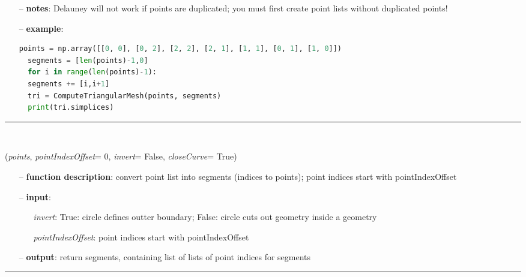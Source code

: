 \begin{itemize}[leftmargin=1.4cm]
\begin{itemize}[leftmargin=1.4cm]
\begin{itemize}[leftmargin=0.5cm]
\begin{itemize}[leftmargin=1.4cm]
\begin{itemize}[leftmargin=1.4cm]
\begin{itemize}[leftmargin=0.5cm]
\begin{itemize}[leftmargin=1.4cm]
\begin{itemize}[leftmargin=0.5cm]
\begin{itemize}[leftmargin=0.7cm]
\item[--]
{\bf notes}: Delauney will not work if points are duplicated; you must first create point lists without duplicated points!
\item[--]
{\bf example}: \vspace{-12pt}\ei\begin{lstlisting}[language=Python, xleftmargin=36pt]
  points = np.array([[0, 0], [0, 2], [2, 2], [2, 1], [1, 1], [0, 1], [1, 0]])
  segments = [len(points)-1,0]
  for i in range(len(points)-1):
  segments += [i,i+1]
  tri = ComputeTriangularMesh(points, segments)
  print(tri.simplices)
\end{lstlisting}\vspace{-24pt}\bi\item[]\vspace{-24pt}\vspace{12pt}\end{itemize}
%
\noindent\rule{8cm}{0.75pt}\vspace{1pt} \\ 
\begin{flushleft}
\label{sec:graphicsDataUtilities:SegmentsFromPoints}
({\it points}, {\it pointIndexOffset}= 0, {\it invert}= False, {\it closeCurve}= True)
\end{flushleft}
\setlength{\itemindent}{0.7cm}
\begin{itemize}[leftmargin=0.7cm]
\item[--]
{\bf function description}: convert point list into segments (indices to points); point indices start with pointIndexOffset
\item[--]
{\bf input}: \vspace{-6pt}
\begin{itemize}[leftmargin=1.2cm]
\setlength{\itemindent}{-0.7cm}
\item[]{\it invert}: True: circle defines outter boundary; False: circle cuts out geometry inside a geometry
\item[]{\it pointIndexOffset}: point indices start with pointIndexOffset
\end{itemize}
\item[--]
{\bf output}: return segments, containing list of lists of point indices for segments
\vspace{12pt}\end{itemize}
%
\noindent\rule{8cm}{0.75pt}\vspace{1pt} \\ 

\end{itemize}
\end{itemize}
\end{itemize}
\end{itemize}
\end{itemize}
\end{itemize}
\end{itemize}
\end{itemize}
